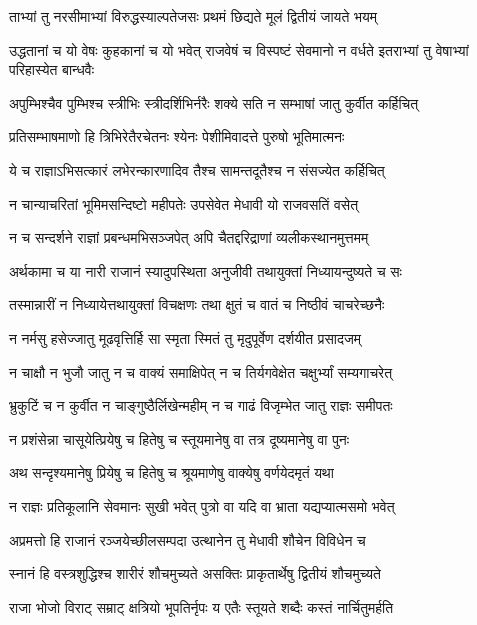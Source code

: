 \twolineshloka
{ताभ्यां तु नरसीमाभ्यां विरुद्धस्याल्पतेजसः}
{प्रथमं छिद्यते मूलं द्वितीयं जायते भयम्}


\threelineshloka
{उद्धतानां च यो वेषः कुहकानां च यो भवेत्}
{राजवेषं च विस्पष्टं सेवमानो न वर्धते}
{इतराभ्यां तु वेषाभ्यां परिहास्येत बान्धवैः}


\twolineshloka
{अपुम्भिश्चैव पुम्भिश्च स्त्रीभिः स्त्रीदर्शिभिर्नरैः}
{शक्ये सति न सम्भाषां जातु कुर्वीत कर्हिचित्}


\twolineshloka
{प्रतिसम्भाषमाणो हि त्रिभिरेतैरचेतनः}
{श्येनः पेशीमिवादत्ते पुरुषो भूतिमात्मनः}


\twolineshloka
{ये च राज्ञाऽभिसत्कारं लभेरन्कारणादिव}
{तैश्च सामन्तदूतैश्च न संसज्येत कर्हिचित्}


\twolineshloka
{न चान्याचरितां भूमिमसन्दिष्टो महीपतेः}
{उपसेवेत मेधावी यो राजवसतिं वसेत्}


\twolineshloka
{न च सन्दर्शने राज्ञां प्रबन्धमभिसञ्जपेत्}
{अपि चैतद्दरिद्राणां व्यलीकस्थानमुत्तमम्}


\twolineshloka
{अर्थकामा च या नारी राजानं स्यादुपस्थिता}
{अनुजीवी तथायुक्तां निध्यायन्दुष्यते च सः}


\twolineshloka
{तस्मान्नारीं न निध्यायेत्तथायुक्तां विचक्षणः}
{तथा क्षुतं च वातं च निष्ठीवं चाचरेच्छनैः}


\twolineshloka
{न नर्मसु हसेज्जातु मूढवृत्तिर्हि सा स्मृता}
{स्मितं तु मृदुपूर्वेण दर्शयीत प्रसादजम्}


\twolineshloka
{न चाक्षौ न भुजौ जातु न च वाक्यं समाक्षिपेत्}
{न च तिर्यगवेक्षेत चक्षुर्भ्यां सम्यगाचरेत्}


\twolineshloka
{भ्रुकुटिं च न कुर्वीत न चाङ्गुष्ठैर्लिखेन्महीम्}
{न च गाढं विजृम्भेत जातु राज्ञः समीपतः}


\twolineshloka
{न प्रशंसेन्ना चासूयेत्प्रियेषु च हितेषु च}
{स्तूयमानेषु वा तत्र दूष्यमानेषु वा पुनः}


\twolineshloka
{अथ सन्दृश्यमानेषु प्रियेषु च हितेषु च}
{श्रूयमाणेषु वाक्येषु वर्णयेदमृतं यथा}


\twolineshloka
{न राज्ञः प्रतिकूलानि सेवमानः सुखी भवेत्}
{पुत्रो वा यदि वा भ्राता यद्यप्यात्मसमो भवेत्}


\twolineshloka
{अप्रमत्तो हि राजानं रञ्जयेच्छीलसम्पदा}
{उत्थानेन तु मेधावी शौचेन विविधेन च}


\twolineshloka
{स्नानं हि वस्त्रशुद्धिश्च शारीरं शौचमुच्यते}
{असक्तिः प्राकृतार्थेषु द्वितीयं शौचमुच्यते}


\twolineshloka
{राजा भोजो विराट् सम्राट् क्षत्रियो भूपतिर्नृपः}
{य एतैः स्तूयते शब्दैः कस्तं नार्चितुमर्हति}


